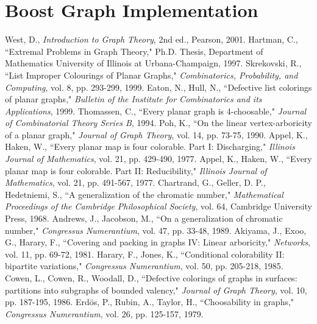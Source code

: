 \documentclass[letterpaper, 12pt]{amsart}
\theoremstyle{definition}
\theoremstyle{definition}
\theoremstyle{thm}
\theoremstyle{definition}
\begin{document}
\section{Boost Graph Implementation}


\begin{thebibliography}{21}  %
	West, D., \textit{Introduction to Graph Theory},
	2nd ed., Pearson, 2001.
	Hartman, C.,
	``Extremal Problems in Graph Theory," Ph.D. Thesis, Department of
	Mathematics University of Illinois at Urbana-Champaign, 1997.
	Skrekovski, R., ``List Improper Colourings of Planar Graphs,"
	\textit{Combinatorics, Probability, and Computing}, vol. 8, pp. 293-299,
	1999.
	Eaton, N., Hull, N., ``Defective list colorings of planar graphs,"
	\emph{Bulletin of the Institute for Combinatorics and its Applications},
	1999.
	Thomassen, C., ``Every planar graph is 4-choosable,"
	\emph{Journal of Combinatorial Theory Series B}, 1994.
	Poh, K., ``On the linear vertex-arboricity of a planar graph,"
	\emph{Journal of Graph Theory}, vol. 14, pp. 73-75, 1990.
	Appel, K., Haken, W., ``Every planar map is four colorable. Part I:
	Discharging," \textit{Illinois Journal of Mathematics}, vol. 21, pp. 429-490,
	1977.
	Appel, K., Haken, W., ``Every planar map is four colorable. Part II:
	Reducibility," \textit{Illinois Journal of Mathematics}, vol. 21, pp.
	491-567, 1977.
	Chartrand, G., Geller, D. P., Hedetniemi, S., ``A generalization of the
	chromatic number," \textit{Mathematical Proceedings of the Cambridge
	Philosophical Society}, vol. 64, Cambridge University Press, 1968.
	Andrews, J., Jacobson, M., ``On a generalization of chromatic number,"
	\textit{Congressus Numerantium}, vol. 47, pp. 33-48, 1989.
	Akiyama, J., Exoo, G., Harary, F., ``Covering and packing in graphs IV: Linear arboricity,"
	\textit{Networks}, vol. 11, pp. 69-72, 1981.
	Harary, F., Jones, K., ``Conditional colorability II: bipartite variations,"
	\textit{Congressus Numerantium}, vol. 50, pp. 205-218, 1985.
	Cowen, L., Cowen, R., Woodall, D., ``Defective colorings of graphs in
	surfaces: partitions into subgraphs of bounded valency,"
	\textit{Journal of Graph Theory}, vol. 10, pp. 187-195, 1986.
	Erd{\"o}s, P., Rubin, A., Taylor, H., ``Choosability in graphs,"
	\textit{Congressus Numerantium}, vol. 26, pp. 125-157, 1979.

\end{thebibliography}
\end{document}
